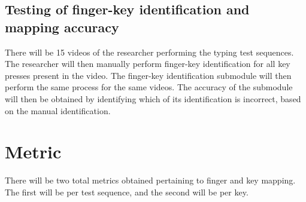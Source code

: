 \documentclass{report}
\begin{document}
\subsection{Testing of finger-key identification and mapping accuracy}

There will be 15 videos of the researcher performing the typing test sequences.
The researcher will then manually perform finger-key identification for all key
presses present in the video. The finger-key identification submodule will then
perform the same process for the same videos. The accuracy of the submodule will
then be obtained by identifying which of its identification is incorrect, based
on the manual identification.

\section{Metric}
\label{section:metric}

There will be two total metrics obtained pertaining to finger and key mapping.
The first will be per test sequence, and the second will be per key.


\newpage
\printbibliography[heading=bibintoc,title={References}]{}
\end{document}
